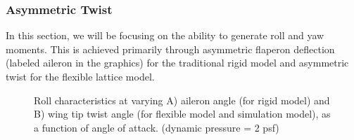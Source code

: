 \documentclass[11pt]{ucthesis}
\begin{document}
\subsubsection{Asymmetric Twist}
In this section, we will be focusing on the ability to generate roll and yaw moments. This is achieved primarily through asymmetric flaperon deflection (labeled aileron in the graphics) for the traditional rigid model and asymmetric twist for the flexible lattice model.

\begin{figure}[thpb]
\hfill
{}
\hfill
{}
\hfill
\caption{Roll characteristics at varying A) aileron angle (for rigid model) and B) wing tip twist angle (for flexible model and simulation model), as a function of angle of attack. (dynamic pressure = 2 psf)}
\label{fig:Q2Roll}
\end{figure}
\end{document}
